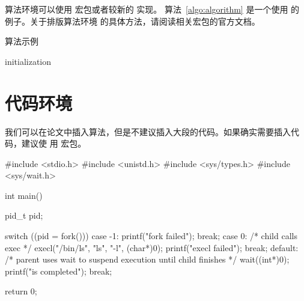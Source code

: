 算法环境可以使用  宏包或者较新的  实现。
算法~\ref{algo:algorithm} 是一个使用  的例子。关于排版算法环境
的具体方法，请阅读相关宏包的官方文档。

\begin{algorithm}[htb]
  \caption{算法示例}
  \label{algo:algorithm}
  \small
  \SetAlgoLined

  initialization\;
\end{algorithm}

\section{代码环境}

我们可以在论文中插入算法，但是不建议插入大段的代码。如果确实需要插入代码，建议使
用  宏包。

\begin{codeblock}[language=C]
#include <stdio.h>
#include <unistd.h>
#include <sys/types.h>
#include <sys/wait.h>

int main() {
  pid_t pid;

  switch ((pid = fork())) {
  case -1:
    printf("fork failed\n");
    break;
  case 0:
    /* child calls exec */
    execl("/bin/ls", "ls", "-l", (char*)0);
    printf("execl failed\n");
    break;
  default:
    /* parent uses wait to suspend execution until child finishes */
    wait((int*)0);
    printf("is completed\n");
    break;
  }

  return 0;
}
\end{codeblock}
